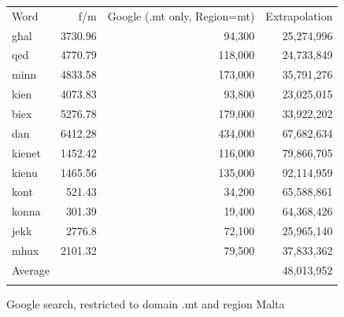 \begin{multicols}{2}
\begin{figure}[tb]
\setlength{\tabcolsep}{2.5em}
\begin{tabularx}{\textwidth}{lrrr} \toprule\addlinespace
Word & f/m & Google (.mt only, Region=mt) &  Extrapolation \\ \addlinespace\midrule\addlinespace
għal & 3730.96 & 94,300 & 25,274,996 \\
qed	& 4770.79 & 118,000 & 24,733,849 \\
minn & 4833.58 & 173,000 & 35,791,276 \\
kien & 4073.83 & 93,800 & 23,025,015 \\
biex & 5276.78 & 179,000 & 33,922,202 \\
dan	& 6412.28 & 434,000 & 67,682,634 \\
kienet & 1452.42 & 116,000 & 79,866,705 \\
kienu & 1465.56 & 135,000 & 92,114,959 \\
kont & 521.43 & 34,200 & 65,588,861 \\
konna & 301.39 & 19,400 & 64,368,426 \\
jekk & 2776.8 & 72,100 & 25,965,140 \\
mhux & 2101.32 & 79,500 & 37,833,362 \\ \addlinespace\midrule\addlinespace
Average& & & 48,013,952 \\ \addlinespace\bottomrule
\end{tabularx}
\caption{Google search, restricted to domain .mt and region Malta}
\label{table:Google_A_en}
\end{figure}


\end{multicols}
